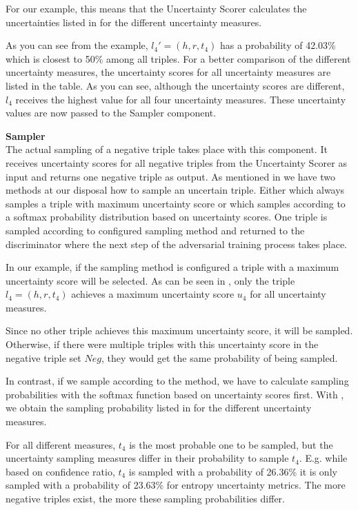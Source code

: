 For our example, this means that the Uncertainty Scorer calculates the uncertainties listed in  for the different uncertainty measures.

As you can see from the example, $l_4' = (h, r, t_4)$ has a probability of 42.03\% which is closest to 50\% among all triples.
For a better comparison of the different uncertainty measures, the uncertainty scores for all uncertainty measures are listed in the table.
As you can see, although the uncertainty scores are different, $l_4$ receives the highest value for all four uncertainty measures.
These uncertainty values are now passed to the Sampler component.

\textbf{Sampler} \\
The actual sampling of a negative triple takes place with this component.
It receives uncertainty scores for all negative triples from the Uncertainty Scorer as input and returns one negative triple as output.
As mentioned in  we have two methods at our disposal how to sample an uncertain triple.
Either \usmax which always samples a triple with maximum uncertainty score or \ussoftmax which samples according to a softmax probability distribution based on uncertainty scores.
One triple is sampled according to configured sampling method and returned to the discriminator where the next step of the adversarial training process takes place.

In our example, if the \usmax sampling method is configured a triple with a maximum uncertainty score will be selected.
As can be seen in , 
only the triple $l_4 = (h,r,t_4)$ achieves a maximum uncertainty score $u_4$ for all uncertainty measures.

Since no other triple achieves this maximum uncertainty score, it will be sampled.
Otherwise, if there were multiple triples with this uncertainty score in the negative triple set $Neg$, they would get the same probability of being sampled.

In contrast, if we sample according to the \ussoftmax method, we have to calculate sampling probabilities with the softmax function based on uncertainty scores first.
With , we obtain the sampling probability listed in  for the different uncertainty measures.

For all different measures, $t_4$ is the most probable one to be sampled, but the uncertainty sampling measures differ in their probability to sample $t_4$.
E.g. while based on confidence ratio, $t_4$ is sampled with a probability of 26.36\% it is only sampled with a probability of 23.63\% for entropy uncertainty metrics.
The more negative triples exist, the more these sampling probabilities differ.

